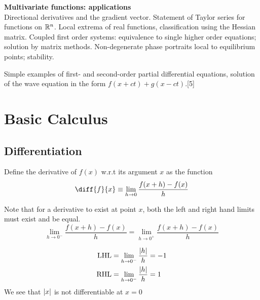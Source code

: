 \documentclass{article}
\begin{document}
{    \vspace{10pt}
    \noindent\textbf{Multivariate functions: applications}\\
    Directional derivatives and the gradient vector. Statement of Taylor series for functions on $\mathbb{R}^n$. Local extrema of real functions, classification using the Hessian matrix. Coupled first order systems: equivalence to single higher order equations; solution by matrix methods. Non-degenerate phase portraits local to equilibrium points; stability.
    
    \vspace{5pt}
    \noindent Simple examples of first- and second-order partial differential equations, solution of the wave equation in the form $f(x + ct) + g(x - ct)$.\hspace*{\fill}[5]}

\tableofcontents


\section{Basic Calculus}
\subsection{Differentiation}
\begin{defi}
    Define the derivative of $f(x)$ w.r.t its argument $x$ as the function
    \[
        \diff{f}{x} \equiv \lim_{h \rightarrow 0}{\frac{f(x +h) - f(x)}{h}}
    \]


    Note that for a derivative to exist at point $x$, both the left and right hand limits must exist and be equal. 
    \[
        \lim_{h \rightarrow 0^-}{\frac{f(x +h) - f(x)}{h}} = \lim_{h \rightarrow 0^+}{\frac{f(x +h) - f(x)}{h}}
    \]
\end{defi}

\begin{eg}[$f(x) = \abs{x}$]
    \begin{align*}
        \text{LHL} &= \lim_{h \rightarrow 0^-}{\frac{\left\lvert h\right\rvert}{h}} = -1 \\
        \text{RHL} &= \lim_{h \rightarrow 0^-}{\frac{\left\lvert h\right\rvert}{h}} = 1
    \end{align*}
    We see that $\left\lvert x\right\rvert$ is not differentiable at $x=0$
\end{eg}
\end{document}
